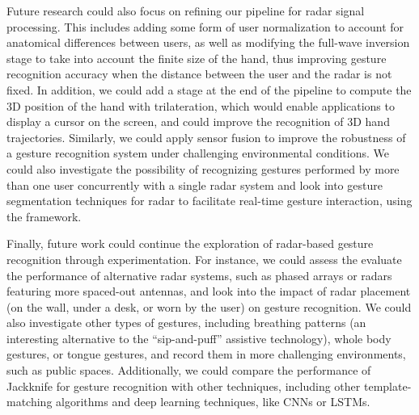 Future research could also focus on refining our pipeline for radar signal processing.
%
This includes adding some form of user normalization to account for anatomical differences between users, as well as modifying the full-wave inversion stage to take into account the finite size of the hand, thus improving gesture recognition accuracy when the distance between the user and the radar is not fixed.
% 
In addition, we could add a stage at the end of the pipeline to compute the 3D position of the hand with trilateration, which would enable applications to display a cursor on the screen, and could improve the recognition of 3D hand trajectories.
%
Similarly, we could apply sensor fusion to improve the robustness of a gesture recognition system under challenging environmental conditions.
% 
We could also investigate the possibility of recognizing gestures performed by more than one user concurrently with a single radar system and look into gesture segmentation techniques for radar to facilitate real-time gesture interaction, \eg using the \ql framework.



Finally, future work could continue the exploration of radar-based gesture recognition through experimentation.
%
For instance, we could assess the evaluate the performance of alternative radar systems, such as phased arrays or radars featuring more spaced-out antennas, and look into the impact of radar placement (\eg on the wall, under a desk, or worn by the user) on gesture recognition.
%
We could also investigate other types of gestures, including breathing patterns (an interesting alternative to the ``sip-and-puff'' assistive technology), whole body gestures, or tongue gestures, and record them in more challenging environments, such as public spaces.
%
Additionally, we could compare the performance of Jackknife for gesture recognition with other techniques, including other template-matching algorithms and deep learning techniques, like CNNs or LSTMs.
